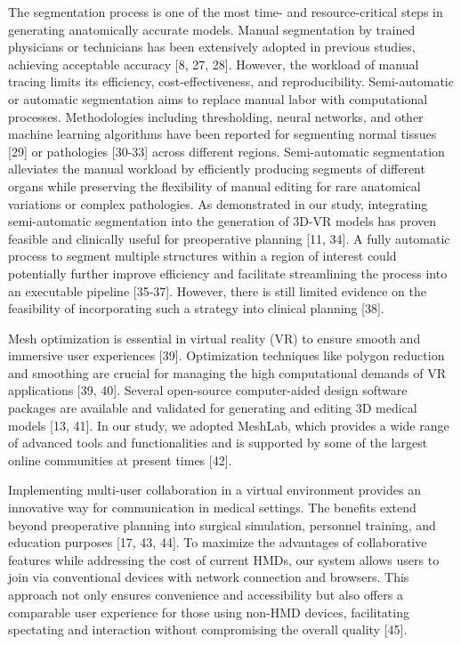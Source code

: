 \documentclass{bmcart}
\begin{document}
The segmentation process is one of the most time- and resource-critical steps in generating anatomically accurate models. Manual segmentation by trained physicians or technicians has been extensively adopted in previous studies, achieving acceptable accuracy [8, 27, 28]. However, the workload of manual tracing limits its efficiency, cost-effectiveness, and reproducibility. Semi-automatic or automatic segmentation aims to replace manual labor with computational processes. Methodologies including thresholding, neural networks, and other machine learning algorithms have been reported for segmenting normal tissues [29] or pathologies [30-33] across different regions. Semi-automatic segmentation alleviates the manual workload by efficiently producing segments of different organs while preserving the flexibility of manual editing for rare anatomical variations or complex pathologies. As demonstrated in our study, integrating semi-automatic segmentation into the generation of 3D-VR models has proven feasible and clinically useful for preoperative planning [11, 34]. A fully automatic process to segment multiple structures within a region of interest could potentially further improve efficiency and facilitate streamlining the process into an executable pipeline [35-37]. However, there is still limited evidence on the feasibility of incorporating such a strategy into clinical planning [38].

Mesh optimization is essential in virtual reality (VR) to ensure smooth and immersive user experiences [39]. Optimization techniques like polygon reduction and smoothing are crucial for managing the high computational demands of VR applications [39, 40]. Several open-source computer-aided design software packages are available and validated for generating and editing 3D medical models [13, 41]. In our study, we adopted MeshLab, which provides a wide range of advanced tools and functionalities and is supported by some of the largest online communities at present times [42].

Implementing multi-user collaboration in a virtual environment provides an innovative way for communication in medical settings. The benefits extend beyond preoperative planning into surgical simulation, personnel training, and education purposes [17, 43, 44]. To maximize the advantages of collaborative features while addressing the cost of current HMDs, our system allows users to join via conventional devices with network connection and browsers. This approach not only ensures convenience and accessibility but also offers a comparable user experience for those using non-HMD devices, facilitating spectating and interaction without compromising the overall quality [45].
\end{document}
